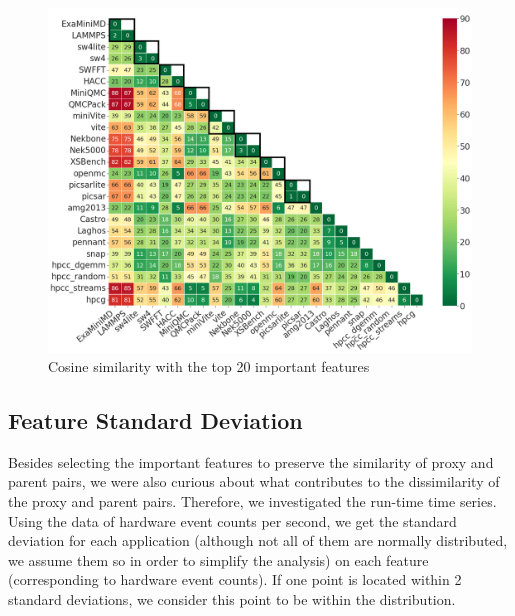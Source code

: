 \begin{figure}[ht]
\centering
\includegraphics[width=\linewidth]{figs/top20cosine_origin_color_font20.png}
\caption{Cosine similarity with the top 20 important features}
\label{figs:top20Cosine}
\end{figure}

\subsection{Feature Standard Deviation}
\label{sec:Dev}
Besides selecting the important features to preserve the similarity of proxy and parent pairs, we were also curious about what contributes to the dissimilarity of the proxy and parent pairs. Therefore, we investigated the run-time time series. Using the data of hardware event counts per second, we get the standard deviation for each application (although not all of them are normally distributed, we assume them so in order to simplify the analysis) on each feature (corresponding to hardware event counts). If one point is located within 2 standard deviations, we consider this point to be within the distribution.


